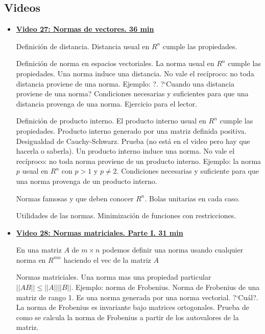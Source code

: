 \documentclass[12pt,a4paper]{article}
\newcommand\1{\mbox{\,\vrule height-0.8pt depth1.0pt width2pc\,}}
\newcommand\2{\mbox{\,\vrule height-0.8pt depth1.0pt width1pc\,}}
\begin{document}
\subsection*{Videos}

\begin{itemize}

       
    \item      \href{https://youtu.be/HeNuPWbOAX4}{\bf Video 27: Normas de vectores. 36 min} 
       
       Definici\'on de distancia. Distancia usual en $R^n$ cumple las propiedades.
       
       Definici\'on de norma en espacios vectoriales. La norma usual en $R^n$ cumple las propiedades. Una norma induce una distancia. No vale el rec\'iproco: no toda distancia proviene de una norma. Ejemplo: ?. ?`Cuando una distancia proviene de una norma? Condiciones necesarias y suficientes para que una distancia provenga de una norma. Ejercicio para el lector. 
      
     Definici\'on de producto interno. El producto interno usual en $R^n$ cumple las propiedades. Producto interno generado por una matriz definida positiva. Desigualdad de Cauchy-Schwarz. Prueba (no est\'a en el video pero hay que hacerla o saberla). Un producto interno induce una norma. No vale el rec\'iproco: no toda norma proviene de un producto interno. Ejemplo: la norma $p$ usual en $R^n$
       con $p>1$ y $p\not=2$. Condiciones necesarias y suficiente para que una norma provenga de un producto interno. 
       
       Normas famosas y que deben conocer $R^n$. Bolas unitarias en cada caso.
       
       Utilidades de las normas. Minimizaci\'on de funciones con restricciones. 
       
        \item      \href{https://youtu.be/qSGLRy33zyw}{\bf Video 28: Normas matriciales. Parte I.  31 min} 
        
        En una matriz $A$ de $m\times n $ podemos definir una norma usando cualquier norma en $R^{m n}$ haciendo el vec de la matriz $A$
        
        Normas matriciales. Una norma mas una propiedad particular $||A B||\le ||A||||B||$. Ejemplo: norma de Frobenius. Norma de Frobenius de una matriz de rango 1. Es una norma generada por una norma vectorial. ?`Cu\'al?. La norma de Frobenius es invariante bajo matrices ortogonales. Prueba de como se calcula la norma de Frobenius a partir de los autovalores de la matriz. 
        

\end{itemize}
\end{document}
